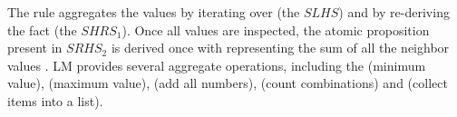 The rule aggregates the values  by iterating over
 (the $SLHS$) and by re-deriving the
fact  (the $SHRS_1$). Once all
values are inspected, the atomic proposition  present in
$SRHS_2$ is derived once with  representing the sum of all the
neighbor values . LM provides several aggregate operations, including the
 (minimum value),  (maximum value),  (add all
numbers),  (count combinations) and  (collect items
into a list).

